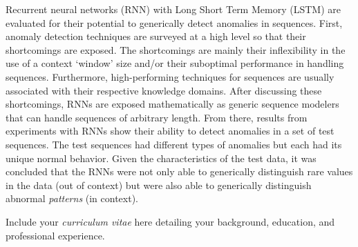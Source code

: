 \documentclass[11 pt]{report}
\begin{document}

\tableofcontents

\listoftables

\listoffigures



\abstractpage

Recurrent neural networks (RNN) with Long Short Term Memory (LSTM) are evaluated for their potential to generically detect anomalies in sequences.
%
First, anomaly detection techniques are surveyed at a high level so that their shortcomings are exposed.
%
The shortcomings are mainly their inflexibility in the use of a context `window' size and/or their suboptimal performance in handling sequences.
%
Furthermore, high-performing techniques for sequences are usually associated with their respective knowledge domains.
%
After discussing these shortcomings, RNNs are exposed mathematically as generic sequence modelers that can handle sequences of arbitrary length.
%
From there, results from experiments with RNNs show their ability to detect anomalies in a set of test sequences.
%
The test sequences had different types of anomalies but each had its unique normal behavior.
%
Given the characteristics of the test data, it was concluded that the RNNs were not only able to generically distinguish rare values in the data (out of context) but were also able to generically distinguish abnormal \emph{patterns} (in context).




\startofchapters













\appendix
\appendixeqnumbering





\cvpage %

\noindent Include your \emph{curriculum vitae} here detailing your background,
education, and professional experience.
\end{document}
